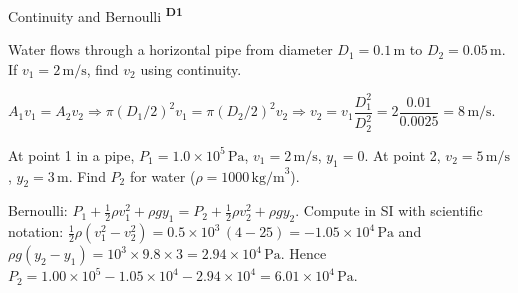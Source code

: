 ﻿\documentclass[12pt,a4paper]{article}
\providecommand{\KPProblems}{}
\newcommand{\DOne}{\texorpdfstring{\textsuperscript{\textbf{D1}}}{ D1}}
\begin{document}
\begin{KnowledgePoint}{Continuity and Bernoulli \DOne}
  \KPProblems
\begin{cheatproblem}
  Water flows through a horizontal pipe from diameter $D_1=0.1\,\text{m}$ to $D_2=0.05\,\text{m}$. If $v_1=2\,\text{m/s}$, find $v_2$ using continuity.
\begin{solutionbox}
  $A_1v_1=A_2v_2\Rightarrow\pi(D_1/2)^2v_1=\pi(D_2/2)^2v_2\Rightarrow v_2=v_1\dfrac{D_1^2}{D_2^2}=2\dfrac{0.01}{0.0025}=8\,\text{m/s}$.
\end{solutionbox}
\end{cheatproblem}
\begin{cheatproblem}
  At point 1 in a pipe, $P_1=1.0\times10^5\,\text{Pa}$, $v_1=2\,\text{m/s}$, $y_1=0$. At point 2, $v_2=5\,\text{m/s}$, $y_2=3\,\text{m}$. Find $P_2$ for water ($\rho=1000\,\text{kg/m}^3$).
\begin{solutionbox}
  Bernoulli: $P_1+\tfrac12\rho v_1^2+\rho gy_1=P_2+\tfrac12\rho v_2^2+\rho gy_2$.
  Compute in SI with scientific notation:
  $\tfrac12\rho(v_1^2-v_2^2)=0.5\times10^3\,(4-25)=-1.05\times10^4\,\text{Pa}$ and
  $\rho g(y_2-y_1)=10^3\times9.8\times3=2.94\times10^4\,\text{Pa}$.
  Hence $P_2=1.00\times10^5-1.05\times10^4-2.94\times10^4=6.01\times10^4\,\text{Pa}$.
\end{solutionbox}
\end{cheatproblem}
\end{KnowledgePoint}
\end{document}
